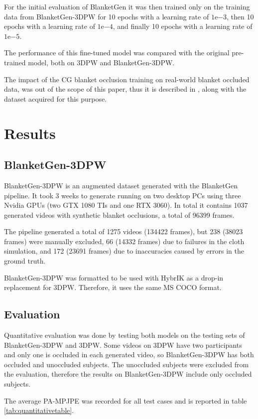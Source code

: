 \documentclass[conference]{IEEEtran}
\begin{document}
For the initial evaluation of BlanketGen it was then trained only on the training data from BlanketGen-3DPW for 10 epochs with a learning rate of $1\mathrm{e}{-3}$, then 10 epochs with a learning rate of $1\mathrm{e}{-4}$, and finally 10 epochs with a learning rate of $1\mathrm{e}{-5}$.

The performance of this fine-tuned model was compared with the original pre-trained model, both on 3DPW and BlanketGen-3DPW.

The impact of the CG blanket occlusion training on real-world blanket occluded data, was out of the scope of this paper, thus it is described in \cite{blanketset}, along with the dataset acquired for this purpose.



\section{Results}
\subsection{BlanketGen-3DPW}
BlanketGen-3DPW is an augmented dataset generated with the BlanketGen pipeline. It took 3 weeks to generate running on two desktop PCs using three Nvidia GPUs (two GTX 1080 TIs and one RTX 3060). In total it contains 1037 generated videos with synthetic blanket occlusions, a total of 96399 frames.

The pipeline generated a total of 1275 videos (134422 frames), but 238 (38023 frames) were manually excluded, 66 (14332 frames) due to failures in the cloth simulation, and 172 (23691 frames) due to inaccuracies caused by errors in the ground truth.

BlanketGen-3DPW was formatted to be used with HybrIK as a drop-in replacement for 3DPW. Therefore, it uses the same MS COCO format. 

\subsection{Evaluation}
Quantitative evaluation was done by testing both models on the testing sets of BlanketGen-3DPW and 3DPW. Some videos on 3DPW have two participants and only one is occluded in each generated video, so BlanketGen-3DPW has both occluded and unoccluded subjects. The unoccluded subjects were excluded from the evaluation, therefore the results on BlanketGen-3DPW include only occluded subjects.

The average PA-MPJPE was recorded for all test cases and is reported in table \ref{tab:quantitativetable}.
\end{document}
